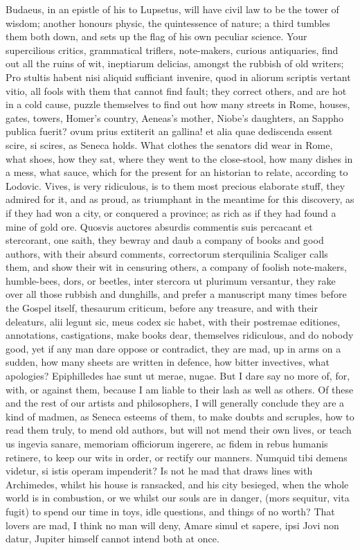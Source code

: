{Budaeus, in an epistle of his to Lupsetus, will have civil law to be
the tower of wisdom; another honours physic, the quintessence of
nature; a third tumbles them both down, and sets up the flag of his own
peculiar science. Your supercilious critics, grammatical triflers,
note-makers, curious antiquaries, find out all the ruins of wit,
ineptiarum delicias, amongst the rubbish of old writers; Pro
stultis habent nisi aliquid sufficiant invenire, quod in aliorum
scriptis vertant vitio, all fools with them that cannot find fault;
they correct others, and are hot in a cold cause, puzzle themselves to
find out how many streets in Rome, houses, gates, towers, Homer's
country, Aeneas's mother, Niobe's daughters, an Sappho publica fuerit?
ovum prius extiterit an gallina! \etc{} et alia quae dediscenda
essent scire, si scires, as Seneca holds. What clothes the
senators did wear in Rome, what shoes, how they sat, where they went to
the close-stool, how many dishes in a mess, what sauce, which for the
present for an historian to relate, according to Lodovic. Vives,
is very ridiculous, is to them most precious elaborate stuff, they
admired for it, and as proud, as triumphant in the meantime for this
discovery, as if they had won a city, or conquered a province; as rich
as if they had found a mine of gold ore. Quosvis auctores absurdis
commentis suis percacant et stercorant, one saith, they bewray and daub
a company of books and good authors, with their absurd comments,
correctorum sterquilinia Scaliger calls them, and show their wit
in censuring others, a company of foolish note-makers, humble-bees,
dors, or beetles, inter stercora ut plurimum versantur, they rake over
all those rubbish and dunghills, and prefer a manuscript many times
before the Gospel itself, thesaurum criticum, before any treasure,
and with their deleaturs, alii legunt sic, meus codex sic habet, with
their postremae editiones, annotations, castigations, \etc{} make books
dear, themselves ridiculous, and do nobody good, yet if any man dare
oppose or contradict, they are mad, up in arms on a sudden, how many
sheets are written in defence, how bitter invectives, what apologies?
Epiphilledes hae sunt ut merae, nugae. But I dare say no more of,
for, with, or against them, because I am liable to their lash as well
as others. Of these and the rest of our artists and philosophers, I
will generally conclude they are a kind of madmen, as  Seneca
esteems of them, to make doubts and scruples, how to read them truly,
to mend old authors, but will not mend their own lives, or teach us
ingevia sanare, memoriam officiorum ingerere, ac fidem in rebus humanis
retinere, to keep our wits in order, or rectify our manners. Numquid
tibi demens videtur, si istis operam impenderit? Is not he mad that
draws lines with Archimedes, whilst his house is ransacked, and his
city besieged, when the whole world is in combustion, or we whilst our
souls are in danger, (mors sequitur, vita fugit) to spend our time in
toys, idle questions, and things of no worth?
That lovers are mad, I think no man will deny, Amare simul et
sapere, ipsi Jovi non datur, Jupiter himself cannot intend both at
once.

}
